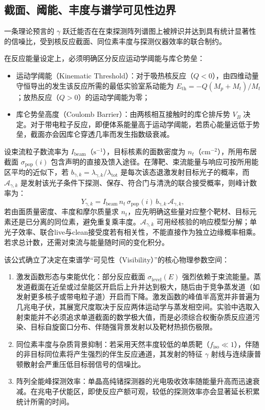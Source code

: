 \subsection{截面、阈能、丰度与谱学可见性边界}\label{subsec:5-1-4}

一条理论预言的 $\gamma$ 跃迁能否在在束探测阵列谱图上被辨识并达到具有统计显著性的信噪比，受到核反应截面、同位素丰度与探测仪器效率的联合制约。

在反应能量设定上，必须明确区分反应运动学阈能与库仑势垒：
\begin{itemize}
\item 运动学阈能（Kinematic Threshold）：对于吸热核反应（$Q < 0$），由四维动量守恒导出的发生该反应所需的最低实验室系动能为 $E_{\mathrm{th}} = -Q (M_p + M_t) / M_t$；放热反应（$Q > 0$）的运动学阈能为零；
\item 库仑势垒高度（Coulomb Barrier）：由两核相互接触时的库仑排斥势 $V_B$ 决定。对于带电粒子反应，即便体系能量高于运动学阈能，若质心能量远低于势垒，截面亦会因库仑穿透几率而发生指数级衰减。
\end{itemize}

设束流粒子数流率为 $I_{\mathrm{beam}}$（$\mathrm{s}^{-1}$），目标核素的面数密度为 $n_t$（$\mathrm{cm}^{-2}$），所用布居截面 $\sigma_{\mathrm{pop}}(i)$ 包含声明的直接及馈入途径。在薄靶、束流能量与响应可按所用能区平均的近似下，若 $b_{\gamma,k}=\lambda_{\gamma,k}/\lambda_{\mathrm{tot}}$ 是每次该态退激发射目标光子的概率，而 $\mathcal A_{\gamma,k}$ 是发射该光子条件下探测、保存、符合门与清洗的联合接受概率，则峰计数率为：
\begin{equation}\label{eq:5-1-yield-gamma}
Y_{\gamma,k}=I_{\mathrm{beam}}\,n_t\,\sigma_{\mathrm{pop}}(i)\,b_{\gamma,k}\,\mathcal A_{\gamma,k},
\end{equation}
若由面质量密度、丰度和摩尔质量求 $n_t$，应先明确这些量对应整个靶材、目标元素还是已分离的同位素，避免重复乘丰度。$\mathcal A_{\gamma,k}$ 可用经核验的响应模型分解；单光子效率、联合live与clean接受度若有相关性，不能直接作为独立边缘概率相乘。若求总计数，还需对束流与能量随时间的变化积分。

该公式确立了决定在束谱学“可见性（Visibility）”的核心物理参数空间：
\begin{enumerate}
\item 激发函数形态与束能优化：部分反应截面 $\sigma_{\mathrm{level}}(E)$ 强烈依赖于束流能量。蒸发道截面在近垒或过垒能区开启后上升并达到极大，随后由于竞争蒸发道（如发射更多核子或带电粒子道）开启而下降。激发函数的峰值半高宽并非普遍为几兆电子伏，其展宽尺度取决于反应两体运动学与蒸发相空间。实验中选取入射束能并不必须追求单道截面的数学极大值，而是必须综合权衡杂质反应道污染、目标自旋窗口分布、伴随强背景发射以及靶材热损伤极限。
\item 同位素丰度与杂质背景抑制：若采用天然丰度较低的单质靶（$f_{\mathrm{iso}} \ll 1$），伴随的非目标同位素将产生强烈的伴生反应通道，其发射的特征 $\gamma$ 射线与连续康普顿散射会严重压低目标弱信号的信噪比。
\item 阵列全能峰探测效率：单晶高纯锗探测器的光电吸收效率随能量升高而迅速衰减。在兆电子伏能区，即使反应产额可观，较低的探测效率亦会显著延长积累统计所需的时间。
\end{enumerate}

